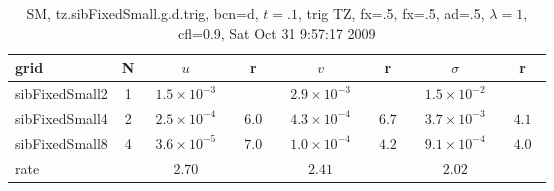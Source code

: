 \begin{table}[hbt]\tableFont %
\begin{center}
\begin{tabular}{|l|c|c|c|c|c|c|c|} \hline 
grid  & N &  $u$  & r &  $v$  & r &  $\sigma$   & r \\ \hline 
      sibFixedSmall2 &     1 & ~$1.5\times10^{ -3}$~ &           & ~$2.9\times10^{ -3}$~ &           & ~$1.5\times10^{ -2}$~ &            \\ \hline
      sibFixedSmall4 &     2 & ~$2.5\times10^{ -4}$~ & ~$  6.0$~ & ~$4.3\times10^{ -4}$~ & ~$  6.7$~ & ~$3.7\times10^{ -3}$~ & ~$  4.1$~  \\ \hline
      sibFixedSmall8 &     4 & ~$3.6\times10^{ -5}$~ & ~$  7.0$~ & ~$1.0\times10^{ -4}$~ & ~$  4.2$~ & ~$9.1\times10^{ -4}$~ & ~$  4.0$~  \\ \hline
    rate             &       &       $2.70$         &       &       $2.41$         &       &       $2.02$         &        \\ \hline
\end{tabular}
\caption{SM, tz.sibFixedSmall.g.d.trig, bcn=d, $t=.1$, trig TZ, fx=.5, fx=.5, ad=.5, $\lambda=1$, cfl=0.9,  Sat Oct 31  9:57:17 2009}\label{table:tz.sibFixedSmall.g.d.trig}
\end{center}
\end{table}
